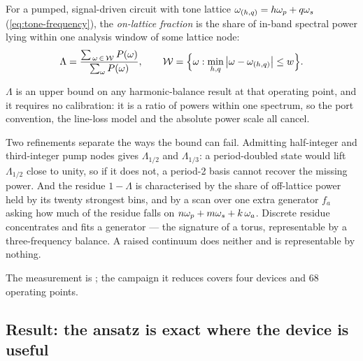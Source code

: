 \begin{definition}
For a pumped, signal-driven circuit with tone lattice
$\omega_{(h,q)} = h\omega_{p} + q\omega_{s}$ (\cref{eq:tone-frequency}), the \emph{on-lattice
fraction} is the share of in-band spectral power lying within one analysis
window of some lattice node:
\begin{equation}
  \Lambda = \frac{\sum_{\,\omega \,\in\, \mathcal{W}} P(\omega)}
                 {\sum_{\omega} P(\omega)},
  \qquad
  \mathcal{W} = \Bigl\{\omega : \min_{h,q}\,
                 \bigl|\omega - \omega_{(h,q)}\bigr| \le w \Bigr\}.
  \label{eq:on-lattice-fraction}
\end{equation}
\end{definition}

$\Lambda$ is an upper bound on any harmonic-balance result at that operating
point, and it requires no calibration: it is a ratio of powers within one
spectrum, so the port convention, the line-loss model and the absolute power
scale all cancel.

Two refinements separate the ways the bound can fail. Admitting half-integer and
third-integer pump nodes gives $\Lambda_{1/2}$ and $\Lambda_{1/3}$: a
period-doubled state would lift $\Lambda_{1/2}$ close to unity, so if it does
not, a period-2 basis cannot recover the missing power. And the residue
$1-\Lambda$ is characterised by the share of off-lattice power held by its
twenty strongest bins, and by a scan over one extra generator $f_a$ asking how
much of the residue falls on $n\omega_{p} + m\omega_{s} + k\,\omega_a$. Discrete residue
concentrates and fits a generator --- the signature of a torus, representable by
a three-frequency balance. A raised continuum does neither and is representable
by nothing.

The measurement is ; the
campaign it reduces covers four devices and \num{68} operating points.

\subsection{Result: the ansatz is exact where the device is useful}

